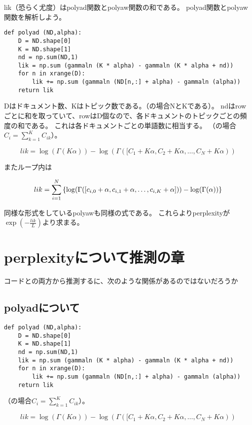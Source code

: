 \documentclass[uplatex]{jsarticle}
\begin{document}
lik（恐らく尤度）はpolyad関数とpolyaw関数の和である。
polyad関数とpolyaw関数を解析しよう。

\begin{lstlisting}
def polyad (ND,alpha):
    D = ND.shape[0]
    K = ND.shape[1]
    nd = np.sum(ND,1)
    lik = np.sum (gammaln (K * alpha) - gammaln (K * alpha + nd))
    for n in xrange(D):
        lik += np.sum (gammaln (ND[n,:] + alpha) - gammaln (alpha))
    return lik
\end{lstlisting}
Dはドキュメント数、Kはトピック数である。（\cite{murphy}の場合NとKである）。
ndはrowごとに和を取っていて、rowはD個なので、各ドキュメントのトピックごとの頻度の和である。
これは各ドキュメントごとの単語数に相当する。
（\cite{murphy}の場合$C_{i} = \sum_{k=1}^{K} C_{ik}$）。

\begin{equation}
lik = \log (\Gamma(K\alpha)) - \log (\Gamma([C_{1} + K\alpha, C_{2} + K\alpha, \ldots, C_{N} + K\alpha))
\end{equation}

またループ内は

\begin{equation}
lik = \sum_{i=1}^{N} \left\{ \log (\Gamma([c_{i,0} + \alpha, c_{i,1} + \alpha, \ldots, c_{i,K} + \alpha\protect])) - \log(\Gamma(\alpha)) \right\}
\end{equation}


同様な形式をしているpolyawも同様の式である。
これらよりperplexityが$\exp(-\frac{lik}{L})$より求まる。

\section{perplexityについて推測の章}
コードと\cite{murphy}の両方から推測するに、次のような関係があるのではないだろうか

\subsection{polyadについて}
\begin{lstlisting}
def polyad (ND,alpha):
    D = ND.shape[0]
    K = ND.shape[1]
    nd = np.sum(ND,1)
    lik = np.sum (gammaln (K * alpha) - gammaln (K * alpha + nd))
    for n in xrange(D):
        lik += np.sum (gammaln (ND[n,:] + alpha) - gammaln (alpha))
    return lik
\end{lstlisting}
（\cite{murphy}の場合$C_{i} = \sum_{k=1}^{K} C_{ik}$）。

\begin{equation}
lik = \log (\Gamma(K\alpha)) - \log (\Gamma([C_{1} + K\alpha, C_{2} + K\alpha, \ldots, C_{N} + K\alpha))
\end{equation}
\end{document}
